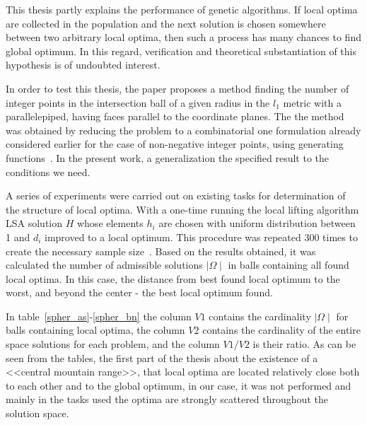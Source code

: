 \documentclass{ifacconf}
\begin{document}
This thesis partly explains the performance of genetic
algorithms. If local optima are collected in the population and
the next solution is chosen somewhere between two arbitrary
local optima, then such a process has many chances to find
global optimum. In this regard, verification and theoretical
substantiation of this hypothesis is of undoubted interest.

In order to test this thesis, the paper proposes a method
finding the number of integer points in the intersection
ball of a given radius in the $l_1$ metric with a parallelepiped,
having faces parallel to the coordinate planes. The
the method was obtained by reducing the problem to a combinatorial one
formulation already considered earlier for the case of non-negative
integer points, using
generating functions~\cite{Sach}. In the present work, a generalization
the specified result to the conditions we need.

A series of experiments were carried out on existing tasks for
determination of the structure of local optima. With a one-time
running the local lifting algorithm LSA solution $H$ whose elements $h_i$ are chosen with
uniform distribution between 1 and $d_i$ improved to a local optimum.
This procedure was repeated 300 times to create the necessary
sample size~\cite{Bose}. Based on the results obtained, it was calculated
the number of admissible solutions $\mid \Omega \mid$ in balls containing all found
local optima. In this case, the distance from
best found local optimum to the worst, and beyond the center -
the best local optimum found.

In table~\ref{spher_as}-\ref{spher_bn} the column $V1$ contains the cardinality $\mid \Omega \mid$ for balls containing
local
optima, the column $V2$ contains the cardinality of the entire space
solutions for each problem, and the column $V1/V2$ is their ratio.
As can be seen from the tables, the first part of the thesis about the existence of a <<central mountain range>>, that
local optima are located relatively close both to each other and to the global optimum,
in our case, it was not performed and mainly in the tasks used
the optima are strongly scattered throughout the solution space.
\end{document}
